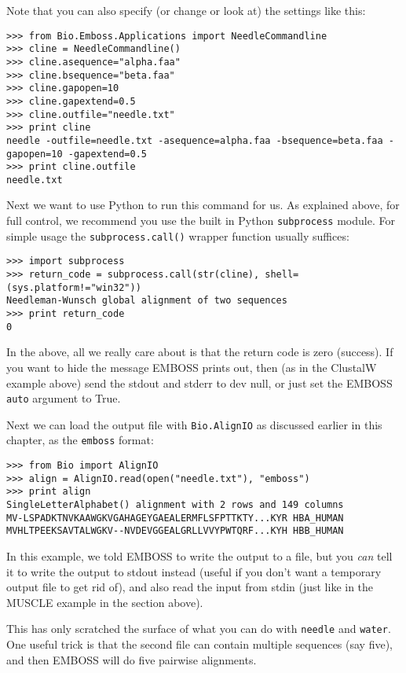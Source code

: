 \documentclass{report}
\begin{document}
Note that you can also specify (or change or look at) the settings like this:

\begin{verbatim}
>>> from Bio.Emboss.Applications import NeedleCommandline
>>> cline = NeedleCommandline()
>>> cline.asequence="alpha.faa"
>>> cline.bsequence="beta.faa"
>>> cline.gapopen=10
>>> cline.gapextend=0.5
>>> cline.outfile="needle.txt"
>>> print cline
needle -outfile=needle.txt -asequence=alpha.faa -bsequence=beta.faa -gapopen=10 -gapextend=0.5 
>>> print cline.outfile
needle.txt
\end{verbatim}

Next we want to use Python to run this command for us. As explained above,
for full control, we recommend you use the built in Python \texttt{subprocess}
module. For simple usage the \texttt{subprocess.call()} wrapper function
usually suffices:

\begin{verbatim}
>>> import subprocess
>>> return_code = subprocess.call(str(cline), shell=(sys.platform!="win32"))
Needleman-Wunsch global alignment of two sequences
>>> print return_code
0
\end{verbatim}

In the above, all we really care about is that the return code is zero
(success). If you want to hide the message EMBOSS prints out, then (as
in the ClustalW example above) send the stdout and stderr to dev null,
or just set the EMBOSS \texttt{auto} argument to True.

Next we can load the output file with \verb|Bio.AlignIO| as
discussed earlier in this chapter, as the \texttt{emboss} format:

\begin{verbatim}
>>> from Bio import AlignIO
>>> align = AlignIO.read(open("needle.txt"), "emboss")
>>> print align
SingleLetterAlphabet() alignment with 2 rows and 149 columns
MV-LSPADKTNVKAAWGKVGAHAGEYGAEALERMFLSFPTTKTY...KYR HBA_HUMAN
MVHLTPEEKSAVTALWGKV--NVDEVGGEALGRLLVVYPWTQRF...KYH HBB_HUMAN
\end{verbatim}

In this example, we told EMBOSS to write the output to a file, but you
\emph{can} tell it to write the output to stdout instead (useful if you
don't want a temporary output file to get rid of), and also read the
input from stdin (just like in the MUSCLE example in the section above).

This has only scratched the surface of what you can do with \texttt{needle}
and \texttt{water}. One useful trick is that the second file can contain
multiple sequences (say five), and then EMBOSS will do five pairwise
alignments.
\end{document}
